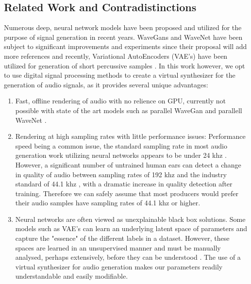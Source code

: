 \documentclass{nime-alternate} %
\begin{document}
\subsection{Related Work and Contradistinctions}
\label{related}
Numerous deep, neural network models have been proposed and utilized for the purpose of signal generation in recent years. WaveGans and WaveNet have been subject to significant improvements and experiments since their proposal \cite{nsynth2017}\colorbox{green!=40}{will add more references} and recently, Variational AutoEncoders (VAE's) have been utilized for generation of short percussive samples \cite{aouameur2019neural,ramires2019timbfeat}. In this work however, we opt to use digital signal processing methods to create a virtual synthesizer for the generation of audio signals, as it provides several unique advantages:
\begin{enumerate}[label=\roman*]
  \item Fast, offline rendering of audio with no relience on GPU, currently not possible with state of the art models such as parallel WaveGan \cite{yamamoto2019parallel} and parallell WaveNet \cite{oord2017parallel}. 
  \item Rendering at high sampling rates with little performance issues: Performance speed being a common issue, the standard sampling rate in most audio generation work utilizing neural networks appears to be under 24 khz \cite{yamamoto2019parallel,oord2017parallel,aouameur2019neural,ramires2019timbfeat}. However, a significant number of untrained human ears can detect a change in quality of audio between sampling rates of 192 khz and the industry standard of 44.1 khz \cite{reiss2016meta}, with a dramatic increase in quality detection after training. Therefore we can safely assume that most producers would prefer their audio samples have sampling rates of 44.1 khz or higher. 
  \item Neural networks are often viewed as unexplainable black box solutions. Some models such as VAE's can learn an underlying latent space of parameters and capture the "essence" of the different labels in a dataset. However, these spaces are learned in an unsupervised manner and must be manually analysed, perhaps extensively, before they can be understood \cite{esling2018generative}. The use of a virtual synthesizer for audio generation makes our parameters readily understandable and easily modifiable. \\
  
\end{enumerate}
\end{document}
